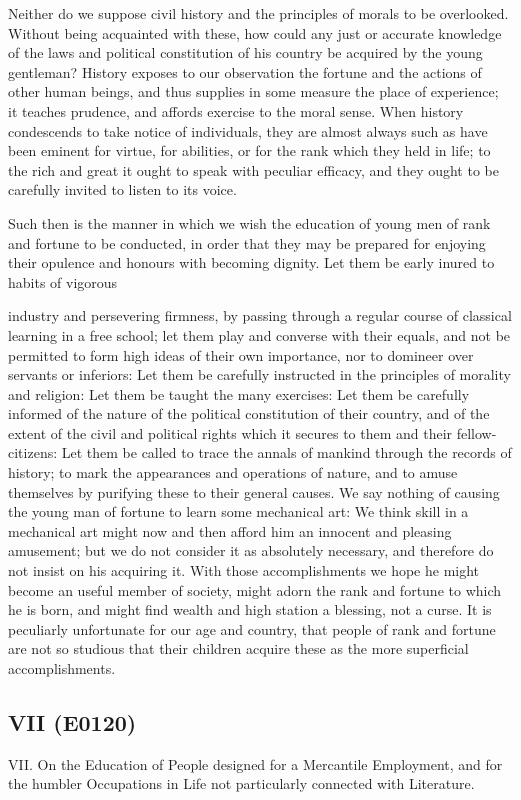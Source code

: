 \documentclass{article}
\begin{document}
Neither do we suppose civil history and the principles of morals to be overlooked. Without being acquainted with these, how could any just or accurate knowledge of the laws and political constitution of his country be acquired by the young gentleman? History exposes to our observation the fortune and the actions of other human beings, and thus supplies in some measure the place of experience; it teaches prudence, and affords exercise to the moral sense. When history condescends to take notice of individuals, they are almost always such as have been eminent for virtue, for abilities, or for the rank which they held in life; to the rich and great it ought to speak with peculiar efficacy, and they ought to be carefully invited to listen to its voice.

Such then is the manner in which we wish the education of young men of rank and fortune to be conducted, in order that they may be prepared for enjoying their opulence and honours with becoming dignity. Let them be early inured to habits of vigorous

industry and persevering firmness, by passing through a regular course of classical learning in a free school; let them play and converse with their equals, and not be permitted to form high ideas of their own importance, nor to domineer over servants or inferiors: Let them be carefully instructed in the principles of morality and religion: Let them be taught the many exercises: Let them be carefully informed of the nature of the political constitution of their country, and of the extent of the civil and political rights which it secures to them and their fellow-citizens: Let them be called to trace the annals of mankind through the records of history; to mark the appearances and operations of nature, and to amuse themselves by purifying these to their general causes. We say nothing of causing the young man of fortune to learn some mechanical art: We think skill in a mechanical art might now and then afford him an innocent and pleasing amusement; but we do not consider it as absolutely necessary, and therefore do not insist on his acquiring it. With those accomplishments we hope he might become an useful member of society, might adorn the rank and fortune to which he is born, and might find wealth and high station a blessing, not a curse. It is peculiarly unfortunate for our age and country, that people of rank and fortune are not so studious that their children acquire these as the more superficial accomplishments.

\subsection*{VII (E0120)}
VII. On the Education of People designed for a Mercantile Employment, and for the humbler Occupations in Life not particularly connected with Literature.
\end{document}
